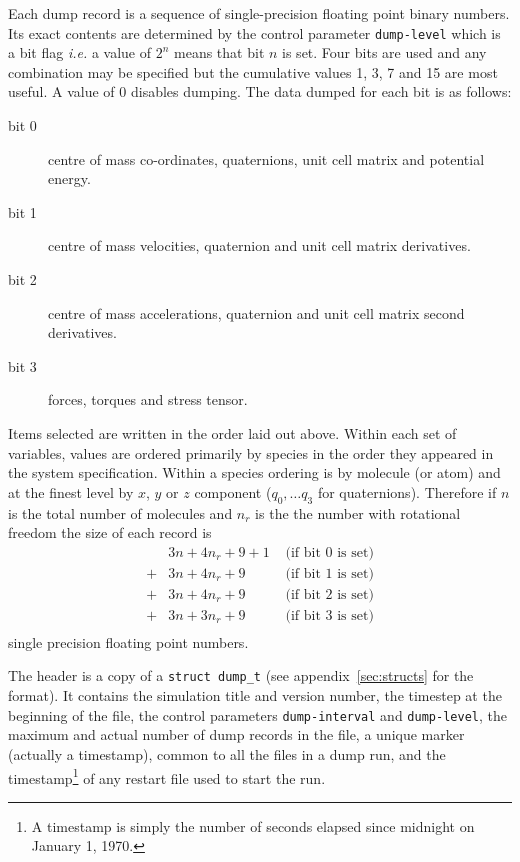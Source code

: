 Each dump record is a sequence of single-precision floating point
binary numbers.  Its exact contents are determined by the control
parameter \verb'dump-level' which is a bit flag {\em i.e.} a value
of $2^{n}$ means that bit $n$ is set.  Four bits are used and any
combination may be specified but the cumulative values 1, 3, 7
and 15 are most useful.  A value of 0 disables dumping. The data
dumped for each bit is as follows:
\begin{description}
\item[bit 0]	centre of mass co-ordinates, quaternions, unit cell matrix 
and potential energy.	      
\item[bit 1]	centre of mass velocities, quaternion and unit cell
matrix derivatives.
\item[bit 2]	centre of mass accelerations, quaternion and unit cell
matrix second derivatives.
\item[bit 3]    forces, torques and stress tensor.
\end{description}
Items selected are written in the order laid out above.  Within each
set of variables, values are ordered primarily by species in the order
they appeared in the system specification.  Within a species ordering
is by molecule (or atom) and at the finest level by $x$, $y$ or $z$
component ($q_{0}, \ldots q_{3}$ for quaternions). Therefore if $n$ is
the total number of molecules and $n_{r}$ is the the number with
rotational freedom the size of each record is
\begin{displaymath}
\begin{array}{cll}
   & 3n + 4n_{r} + 9 + 1 & \mbox{ (if bit 0 is set)} \\
 + & 3n + 4n_{r} + 9 & \mbox{ (if bit 1 is set)} \\
 + & 3n + 4n_{r} + 9 & \mbox{ (if bit 2 is set)} \\
 + & 3n + 3n_{r} + 9 & \mbox{ (if bit 3 is set)} \\
\end{array}
\end{displaymath}
single precision floating point numbers.

The header is a copy of a \verb'struct dump_t' (see
appendix~\ref{sec:structs} for the format). It contains the simulation
title and version number, the timestep at the beginning of the file,
the control parameters \verb'dump-interval' and \verb'dump-level', the
maximum and actual number of dump records in the file, a unique marker
(actually a timestamp), common to all the files in a dump run, and the
timestamp\footnote{A timestamp is simply the number of seconds elapsed
since midnight on January 1, 1970.} of any restart file used to start
the run.

